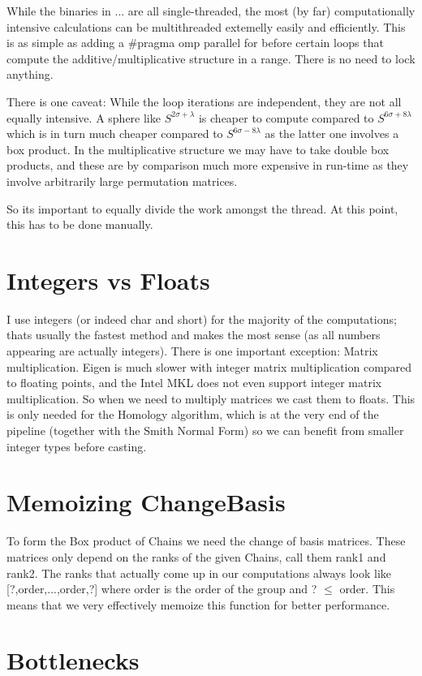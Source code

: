 \begin{DoxyItemize}
\item While the binaries in ... are all single-\/threaded, the most (by far) computationally intensive calculations can be multithreaded extemelly easily and efficiently. This is as simple as adding a {\ttfamily \#pragma omp parallel for} before certain loops that compute the additive/multiplicative structure in a range. There is no need to lock anything.
\item There is one caveat\+: While the loop iterations are independent, they are not all equally intensive. A sphere like $S^{2\sigma+\lambda}$ is cheaper to compute compared to $S^{6\sigma+8\lambda}$ which is in turn much cheaper compared to $S^{6\sigma-8\lambda}$ as the latter one involves a box product. In the multiplicative structure we may have to take double box products, and these are by comparison much more expensive in run-\/time as they involve arbitrarily large permutation matrices.
\item So it\textquotesingle{}s important to equally divide the work amongst the thread. At this point, this has to be done manually.
\end{DoxyItemize}\hypertarget{perf_intvsfloat}{}\section{Integers vs Floats}\label{perf_intvsfloat}
I use integers (or indeed {\ttfamily char} and {\ttfamily short}) for the majority of the computations; that\textquotesingle{}s usually the fastest method and makes the most sense (as all numbers appearing are actually integers). There is one important exception\+: Matrix multiplication. Eigen is much slower with integer matrix multiplication compared to floating points, and the Intel M\+KL does not even support integer matrix multiplication. So when we need to multiply matrices we cast them to floats. This is only needed for the Homology algorithm, which is at the very end of the pipeline (together with the Smith Normal Form) so we can benefit from smaller integer types before casting.\hypertarget{perf_memo}{}\section{Memoizing Change\+Basis}\label{perf_memo}
To form the Box product of Chains we need the change of basis matrices. These matrices only depend on the ranks of the given Chains, call them rank1 and rank2. The ranks that actually come up in our computations always look like \mbox{[}?,order,...,order,?\mbox{]} where order is the order of the group and ? $\le$ order. This means that we very effectively memoize this function for better performance.\hypertarget{perf_bottle}{}\section{Bottlenecks}\label{perf_bottle}

